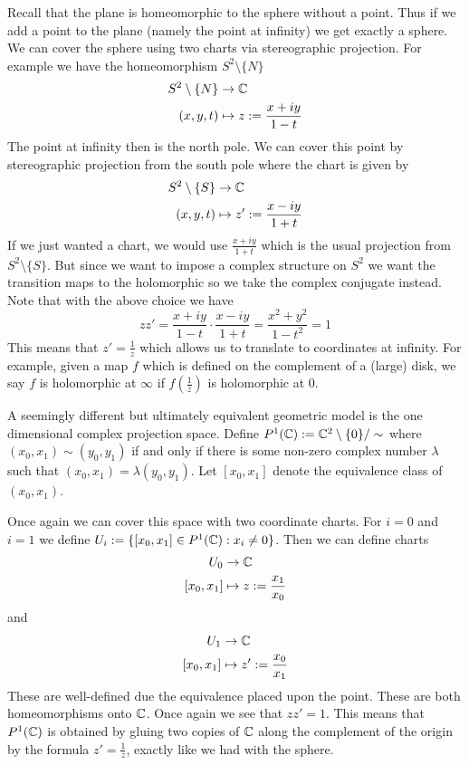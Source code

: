 Recall that the plane is homeomorphic to the sphere without a point. Thus if we add a point to the plane (namely the point at infinity) we get exactly a sphere. We can cover the sphere using two charts via stereographic projection. For example we have the homeomorphism $S^2 \setminus \{N\}$
\begin{align*}
    S^2 \setminus \{N\} &\to \mathbb{C}\\
    (x, y, t) &\mapsto z := \frac{x + iy}{1 - t}
\end{align*}
The point at infinity then is the north pole. We can cover this point by stereographic projection from the south pole where the chart is given by
\begin{align*}
    S^2 \setminus \{S\} &\to \mathbb{C}\\
    (x, y, t) &\mapsto z' := \frac{x - iy}{1 + t}
\end{align*}
If we just wanted a chart, we would use $\frac{x + iy}{1 + t}$ which is the usual projection from $S^2\setminus \{S\}$. But since we want to impose a complex structure on $S^2$ we want the transition maps to the holomorphic so we take the complex conjugate instead. Note that with the above choice we have
$$zz' = \frac{x + iy}{1 - t} \cdot \frac{x - iy}{1 + t} = \frac{x^2 + y^2}{1 - t^2} = 1$$
This means that $z' = \frac{1}{z}$ which allows us to translate to coordinates at infinity. For example, given a map $f$ which is defined on the complement of a (large) disk, we say $f$ is holomorphic at $\infty$ if $f(\frac{1}{z})$ is holomorphic at $0$.

A seemingly different but ultimately equivalent geometric model is the one dimensional complex projection space. Define $P^1(\mathbb{C}) := \mathbb{C}^2 \setminus \{0\}/\sim$ where $(x_0, x_1) \sim (y_0, y_1)$ if and only if there is some non-zero complex number $\lambda$ such that $(x_0, x_1) = \lambda (y_0, y_1)$. Let $[x_0, x_1]$ denote the equivalence class of $(x_0, x_1)$.

Once again we can cover this space with two coordinate charts. For $i = 0$ and $i = 1$ we define $U_i := \{[x_0, x_1] \in P^1(\mathbb{C}) : x_i \neq 0\}$. Then we can define charts
\begin{align*}
    U_0 &\to \mathbb{C}\\
    [x_0, x_1] &\mapsto z := \frac{x_1}{x_0}
\end{align*}
and
\begin{align*}
    U_1 &\to \mathbb{C}\\
    [x_0, x_1] &\mapsto z' := \frac{x_0}{x_1}
\end{align*}
These are well-defined due the equivalence placed upon the point. These are both homeomorphisms onto $\mathbb{C}$. Once again we see that $zz' = 1$. This means that $P^1(\mathbb{C})$ is obtained by gluing two copies of $\mathbb{C}$ along the complement of the origin by the formula $z' = \frac{1}{z}$, exactly like we had with the sphere.

